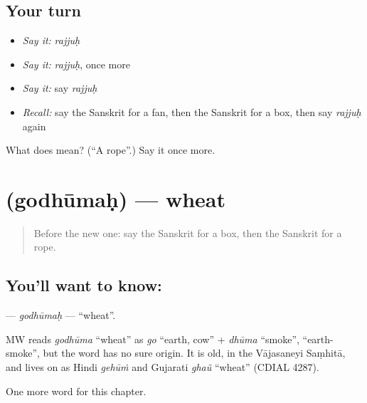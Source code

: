 \subsection*{Your turn}
\begin{itemize}
\raggedright
  \item \emph{Say it:} \emph{rajjuḥ}
  \item \emph{Say it:} \emph{rajjuḥ}, once more
  \item \emph{Say it:} say \emph{rajjuḥ}
  \item \emph{Recall:} say the Sanskrit for a fan, then the Sanskrit for a box, then say \emph{rajjuḥ} again
\end{itemize}

\begin{tcolorbox}[breakable,colback=teal!4,colframe=teal!35!black,title={Before you move on}]
What does  mean? (\textquotedblleft{}A rope\textquotedblright{}.) Say it once more.
\end{tcolorbox}
\section[\texorpdfstring{\sk{गोधूमः} (godhūmaḥ)}{गोधूमः (godhūmaḥ)}]{ (godhūmaḥ) — wheat}

\label{lesson:SA-C106-godhumah}



\begin{quote}
Before the new one: say the Sanskrit for a box, then the Sanskrit for a rope.
\end{quote}

\subsection*{You'll want to know: }
\textbf{} — \emph{godhūmaḥ} — \textquotedblleft{}wheat\textquotedblright{}.

\begin{cousinweb}
MW reads \emph{godhūma} \textquotedblleft{}wheat\textquotedblright{} as \emph{go} \textquotedblleft{}earth, cow\textquotedblright{} + \emph{dhūma} \textquotedblleft{}smoke\textquotedblright{}, \textquotedblleft{}earth-smoke\textquotedblright{}, but the word has no sure origin. It is old, in the Vājasaneyi Saṃhitā, and lives on as Hindi \emph{gehūṁ} and Gujarati \emph{ghaũ} \textquotedblleft{}wheat\textquotedblright{} (CDIAL 4287).
\end{cousinweb}

\begin{grammarlens}[title={What you've built}]
One more word for this chapter.
\end{grammarlens}

